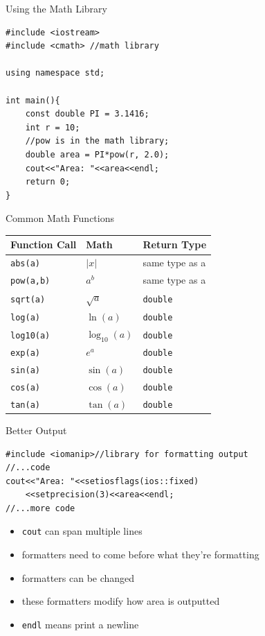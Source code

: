 \documentclass[xcolor={dvipsnames}]{beamer}
\begin{document}
\begin{frame}[fragile]{Using the Math Library}
\begin{verbatim}
#include <iostream>
#include <cmath> //math library

using namespace std;

int main(){
    const double PI = 3.1416;
    int r = 10;
    //pow is in the math library;
    double area = PI*pow(r, 2.0);
    cout<<"Area: "<<area<<endl;
    return 0;
}
\end{verbatim}
\end{frame} 

\begin{frame}{Common Math Functions}

\begin{tabularx}{\textwidth}{| X | X | X |}
\hline
\textbf{Function Call}& \textbf{Math} & \textbf{Return Type}\\
\hline
\hline
\texttt{abs(a)} & $\lvert x\rvert$ & same type as a\\
\texttt{pow(a,b)} & $a^b$ & same type as a \\
\texttt{sqrt(a)} & $\sqrt{a}$ & \texttt{double}\\
\hline
\hline
\texttt{log(a)} & $\ln(a)$ & \texttt{double}\\
\texttt{log10(a)} & $\log_{10}(a)$ & \texttt{double}\\
\texttt{exp(a)} & $e^{a}$ & \texttt{double}\\
\hline
\hline
\texttt{sin(a)} & $\sin(a)$ & \texttt{double}\\
\texttt{cos(a)} & $\cos(a)$ & \texttt{double}\\
\texttt{tan(a)} & $\tan(a)$ & \texttt{double}\\
\hline
\end{tabularx}
\end{frame}

\begin{frame}[fragile]{Better Output}
\begin{verbatim}
#include <iomanip>//library for formatting output
//...code
cout<<"Area: "<<setiosflags(ios::fixed)
    <<setprecision(3)<<area<<endl;
//...more code
\end{verbatim}

\begin{block}{}
	\begin{itemize}
		\item \texttt{cout} can span multiple lines
		\item formatters need to come before what they're formatting
		\item formatters can be changed
		\item these formatters modify how area is outputted
		\item \texttt{endl} means print a newline
	\end{itemize}
\end{block}
\end{frame}
\end{document}
